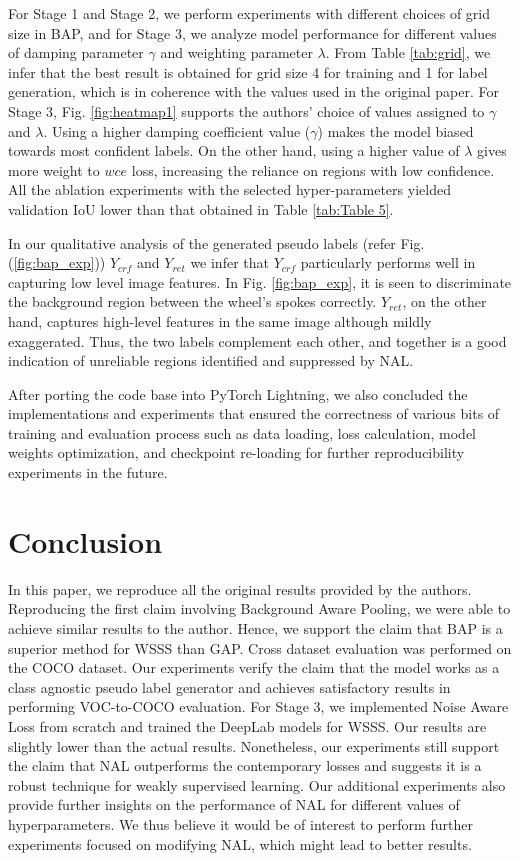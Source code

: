 For Stage 1 and Stage 2, we perform experiments with different choices of grid size in BAP, and for Stage 3, we analyze model performance for different values of damping parameter $\gamma$ and weighting parameter $\lambda$. From Table \ref{tab:grid}, we infer that the best result is obtained for grid size 4 for training and 1 for label generation, which is in coherence with the values used in the original paper. 
For Stage 3, Fig. \ref{fig:heatmap1} supports the authors' choice of values assigned to $\gamma$ and $\lambda$. Using a higher damping coefficient value ($\gamma$) makes the model biased towards most confident labels. On the other hand, using a higher value of $\lambda$ gives more weight to $wce$ loss, increasing the reliance on regions with low confidence. All the ablation experiments with the selected hyper-parameters yielded validation IoU lower than that obtained in Table \ref{tab:Table 5}.

In our qualitative analysis of the generated pseudo labels (refer Fig. (\ref{fig:bap_exp})) $Y_{crf}$ and $Y_{ret}$ we infer that $Y_{crf}$ particularly performs well in capturing low level image features. In Fig. \ref{fig:bap_exp}, it is seen to discriminate the background region between the wheel's spokes correctly. $Y_{ret}$, on the other hand, captures high-level features in the same image although mildly exaggerated. Thus, the two labels complement each other, and together is a good indication of unreliable regions identified and suppressed by NAL.

After porting the code base into PyTorch Lightning, we also concluded the implementations and experiments that ensured the correctness of various bits of training and evaluation process such as data loading, loss calculation, model weights optimization, and checkpoint re-loading for further reproducibility experiments in the future.

\section{Conclusion}
In this paper, we reproduce all the original results provided by the authors. Reproducing the first claim involving Background Aware Pooling, we were able to achieve similar results to the author. Hence, we support the claim that BAP is a superior method for WSSS than GAP. Cross dataset evaluation was performed on the COCO dataset. Our experiments verify the claim that the model works as a class agnostic pseudo label generator and achieves satisfactory results in performing VOC-to-COCO evaluation. For Stage 3, we implemented Noise Aware Loss from scratch and trained the DeepLab models for WSSS. Our results are slightly lower than the actual results. Nonetheless, our experiments still support the claim that NAL outperforms the contemporary losses and suggests it is a robust technique for weakly supervised learning. Our additional experiments also provide further insights on the performance of NAL for different values of hyperparameters. We thus believe it would be of interest to perform further experiments focused on modifying NAL, which might lead to better results.
